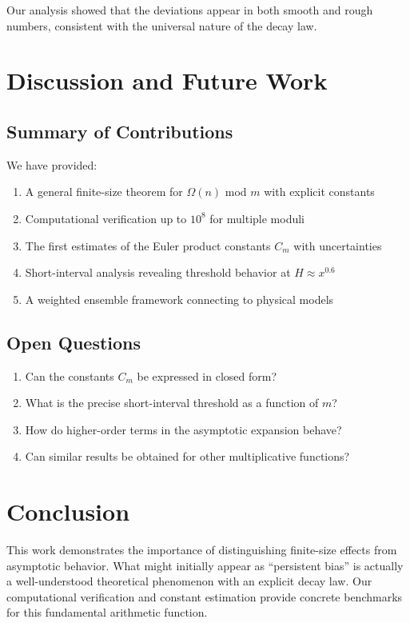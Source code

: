 \documentclass[12pt]{article}
\theoremstyle{definition}
\theoremstyle{remark}
\begin{document}
Our analysis showed that the deviations appear in both smooth and rough numbers, consistent with the universal nature of the decay law.

\section{Discussion and Future Work}

\subsection{Summary of Contributions}

We have provided:
\begin{enumerate}
\item A general finite-size theorem for $\Omega(n)$ mod $m$ with explicit constants
\item Computational verification up to $10^8$ for multiple moduli
\item The first estimates of the Euler product constants $C_m$ with uncertainties
\item Short-interval analysis revealing threshold behavior at $H \approx x^{0.6}$
\item A weighted ensemble framework connecting to physical models
\end{enumerate}

\subsection{Open Questions}

\begin{enumerate}
\item Can the constants $C_m$ be expressed in closed form?
\item What is the precise short-interval threshold as a function of $m$?
\item How do higher-order terms in the asymptotic expansion behave?
\item Can similar results be obtained for other multiplicative functions?
\end{enumerate}

\section{Conclusion}

This work demonstrates the importance of distinguishing finite-size effects from asymptotic behavior. What might initially appear as ``persistent bias'' is actually a well-understood theoretical phenomenon with an explicit decay law. Our computational verification and constant estimation provide concrete benchmarks for this fundamental arithmetic function.
\end{document}
